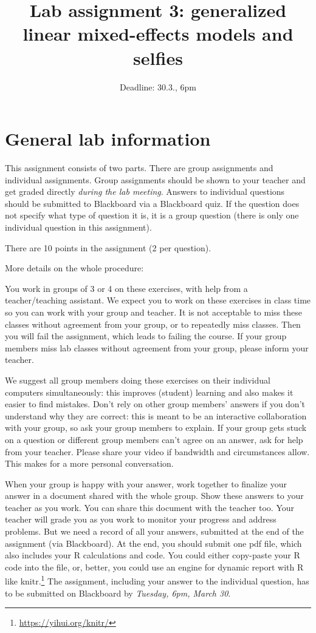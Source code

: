 \documentclass{article}\usepackage[]{graphicx}\usepackage[]{color}
\title{Lab assignment 3: generalized linear mixed-effects models and selfies}
\author{}
\date{Deadline: 30.3., 6pm}
\newcommand{\link}[1]{\footnote{\color{blue}\href{#1}{#1}}}
\begin{document}

\maketitle

\section{General lab information}

This assignment consists of two parts. There are group assignments and individual assignments. Group assignments should be shown to your teacher and get graded directly \emph{during the lab meeting}. Answers to individual questions should be submitted to Blackboard via a Blackboard quiz. If the question does not specify what type of question it is, it is a group question (there is only one individual question in this assignment).

There are 10 points in the assignment (2 per question).

More details on the whole procedure:

You work in groups of 3 or 4 on these exercises, with help from a teacher/teaching assistant. We expect you to work on these exercises in class time so you can work with your group and teacher. It is not acceptable to miss these classes without agreement from your group, or to repeatedly miss classes. Then you will fail the assignment, which leads to failing the course. If your group members miss lab classes without agreement from your group, please inform your teacher.

We suggest all group members doing these exercises on their individual computers simultaneously: this improves (student) learning and also makes it easier to find mistakes. Don't rely on other group members' answers if you don't understand why they are correct: this is meant to be an interactive collaboration with your group, so ask your group members to explain. If your group gets stuck on a question or different group members can't agree on an answer, ask for help from your teacher. Please share your video if bandwidth and circumstances allow. This makes for a more personal conversation.

When your group is happy with your answer, work together to finalize your answer in a document shared with the whole group. Show these answers to your teacher as you work. You can share this document with the teacher too. Your teacher will grade you as you work to monitor your progress and address problems. But we need a record of all your answers, submitted at the end of the assignment (via Blackboard). At the end, you should submit one pdf file, which also includes your R calculations and code. You could either copy-paste your R code into the file, or, better, you could use an engine for dynamic report with R like knitr.\link{https://yihui.org/knitr/} The assignment, including your answer to the individual question, has to be submitted on Blackboard by \emph{Tuesday, 6pm, March 30}.
\end{document}
